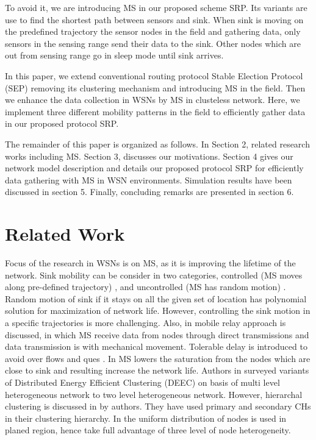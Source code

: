 \documentclass{article}
\begin{document}
To avoid it, we are introducing MS in our proposed scheme SRP. Its variants are use to find the shortest path between sensors and sink. When sink is moving on the predefined trajectory the sensor nodes in the field and gathering data, only sensors in the sensing range send their data to the sink. Other nodes which are out from sensing range go in sleep mode until sink arrives.

In this paper, we extend conventional routing protocol Stable Election Protocol (SEP) \cite{2} removing its clustering mechanism and introducing MS in the field. Then we enhance the data collection in WSNs by MS in clusteless network. Here, we implement three different mobility patterns in the field to efficiently gather data in our proposed protocol SRP.

The remainder of this paper is organized as follows. In Section 2, related research works including MS. Section 3, discusses our motivations. Section 4 gives our network model description and details our proposed protocol SRP for efficiently data gathering with MS in WSN environments. Simulation results have been discussed in section 5. Finally, concluding remarks are presented in section 6.

\section{Related Work}
\label{sec:format}

Focus of the research in WSNs is on MS, as it is improving the lifetime of the network. Sink mobility can be consider in two categories, controlled (MS moves along pre-defined trajectory) \cite{3}, \cite{4} and uncontrolled (MS has random motion) \cite{5}. Random motion of sink if it stays on all the given set of location has polynomial solution for maximization of network life. However, controlling the sink motion in a specific trajectories is more challenging. Also, in \cite{6} mobile relay approach is discussed, in which MS receive data from nodes through direct transmissions and data transmission is with mechanical movement. Tolerable delay is introduced to avoid over flows and ques \cite{7}. In \cite{8} MS lowers the saturation from the nodes which are close to sink and resulting increase the network life. Authors in \cite{9} surveyed variants of Distributed Energy Efficient Clustering (DEEC) on basis of multi level heterogeneous network  to two level heterogeneous network. However, hierarchal clustering is discussed in \cite{10} by authors. They have used primary and secondary CHs in their clustering hierarchy. In \cite{11} the uniform distribution of nodes is used in planed region, hence take full advantage of three level of node heterogeneity.
\end{document}
